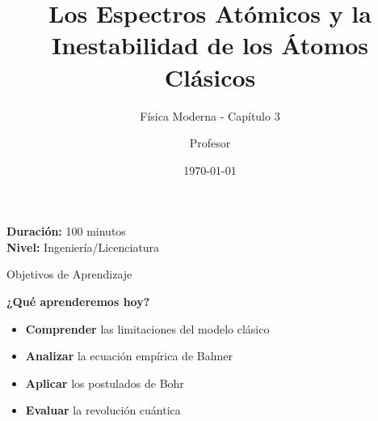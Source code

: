 \documentclass[12pt,aspectratio=169]{beamer}
\title[Espectros Atómicos]{Los Espectros Atómicos y la Inestabilidad de los Átomos Clásicos}
\subtitle{Física Moderna - Capítulo 3}
\author{Profesor}
\institute{Universidad}
\date{\today}
\begin{document}
\begin{frame}
    \titlepage
    \vspace{1cm}
    \begin{center}
        \Large
        \textbf{Duración:} 100 minutos \\
        \textbf{Nivel:} Ingeniería/Licenciatura
    \end{center}
\end{frame}

\begin{frame}{Objetivos de Aprendizaje}
    \vspace{0.5cm}
    \begin{center}
        \huge \textbf{¿Qué aprenderemos hoy?}
    \end{center}
    
    \vspace{1cm}
    \begin{itemize}
        \item[\textbullet] \Large \textbf{Comprender} las limitaciones del modelo clásico
        \vspace{0.5cm}
        \item[\textbullet] \Large \textbf{Analizar} la ecuación empírica de Balmer
        \vspace{0.5cm}
        \item[\textbullet] \Large \textbf{Aplicar} los postulados de Bohr
        \vspace{0.5cm}
        \item[\textbullet] \Large \textbf{Evaluar} la revolución cuántica
    \end{itemize}
\end{frame}
\end{document}
